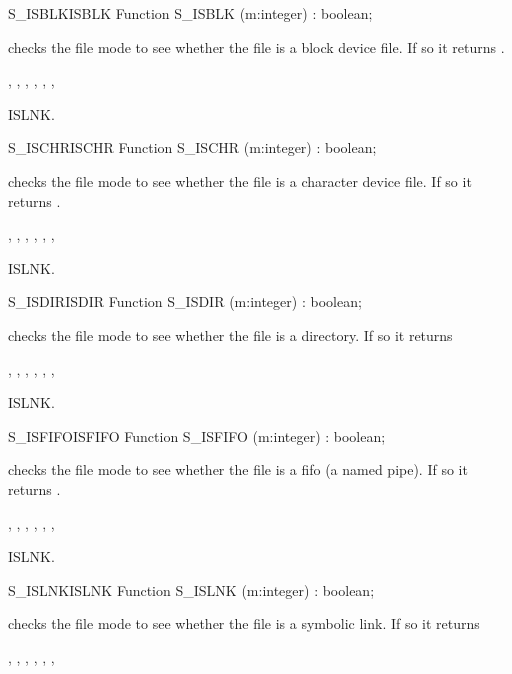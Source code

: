 \begin{functionl}{S\_ISBLK}{ISBLK}
\Declaration
Function S\_ISBLK (m:integer) : boolean;

\Description
  checks the file mode  to see whether the file is a
block device file. If so it returns .

\Errors
{},
 , 
 ,
 ,
 ,
 ,

\SeeAlso
ISLNK.
\end{functionl}
\begin{functionl}{S\_ISCHR}{ISCHR}
\Declaration
Function S\_ISCHR (m:integer) : boolean;

\Description
  checks the file mode  to see whether the file is a
character device file. If so it returns .

\Errors
{},
 , 
 ,
 ,
 ,
 ,

\SeeAlso
ISLNK.
\end{functionl}
\begin{functionl}{S\_ISDIR}{ISDIR}
\Declaration
Function S\_ISDIR (m:integer) : boolean;

\Description
  checks the file mode  to see whether the file is a
directory. If so it returns 

\Errors
{},
 , 
 ,
 ,
 ,
 ,

\SeeAlso
ISLNK.
\end{functionl}
\begin{functionl}{S\_ISFIFO}{ISFIFO}
\Declaration
Function S\_ISFIFO (m:integer) : boolean;

\Description
  checks the file mode  to see whether the file is a
fifo (a named pipe). If so it returns .

\Errors
{},
 , 
 ,
 ,
 ,
 ,

\SeeAlso
ISLNK.
\end{functionl}
\begin{functionl}{S\_ISLNK}{ISLNK}
\Declaration
Function S\_ISLNK (m:integer) : boolean;

\Description
  checks the file mode  to see whether the file is a
symbolic link. If so it returns 

\Errors
{},
 ,
 ,
 ,
 ,
 ,

\SeeAlso

\end{functionl}
